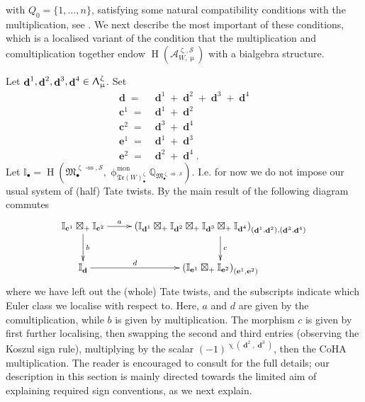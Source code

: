 \documentclass[a4paper,10pt]{amsart}
\renewcommand{\zeta}{\upzeta}
\renewcommand{\chi}{\upchi}
\renewcommand{\Lambda}{\Uplambda}
\renewcommand{\phi}{\upphi}
\renewcommand{\mu}{\upmu}
\newcommand{\SP}{\mathcal{S}}
\newcommand{\WWW}{\mathfrak{Tr}(W)}
\newcommand{\Mst}{\mathfrak{M}}
\newcommand{\phim}[1]{\phi^{\mon}_{#1}}
\DeclareMathOperator{\sst}{-ss}
\DeclareMathOperator{\mon}{mon}
\DeclareMathOperator{\cc}{\mathbf{c}}
\DeclareMathOperator{\dd}{\mathbf{d}}
\DeclareMathOperator{\ee}{\mathbf{e}}
\DeclareMathOperator{\HO}{H}
\begin{document}
with $Q_0=\{1,\ldots,n\}$, satisfying some natural compatibility conditions with the multiplication, see \cite[Def.5.3]{Da13}.  We next describe the most important of these conditions, which is a localised variant of the condition that the multiplication and comultiplication together endow $\HO\left(\mathcal{A}_{W,\mu}^{\zeta,\SP}\right)$ with a bialgebra structure.

Let $\dd^1,\dd^2,\dd^3,\dd^4\in\Lambda_{\mu}^{\zeta}$.  Set 
\begin{align*}
\dd=&\dd^1+\dd^2+\dd^3+\dd^4\\
\cc^1=&\dd^1+\dd^2\\
\cc^2=&\dd^3+\dd^4\\
\ee^1=&\dd^1+\dd^3\\
\ee^2=&\dd^2+\dd^4.
\end{align*}
Let $\mathbb{I}_{\bullet}=\HO\left(\Mst_{\bullet}^{\zeta\sst,\SP},\phim{\WWW^{\zeta}_{\bullet}}\mathbb{Q}_{\Mst_{\bullet}^{\zeta\sst,\SP}}\right)$.  I.e. for now we do not impose our usual system of (half) Tate twists.  By the main result of \cite{Da13} the following diagram commutes
\[
\xymatrix{
\mathbb{I}_{\cc^1}\boxtimes_+ \mathbb{I}_{\cc^2}\ar[d]^-{b}\ar[r]^-a&\left(\mathbb{I}_{\dd^1}\boxtimes_+  \mathbb{I}_{\dd^2}\boxtimes_+  \mathbb{I}_{\dd^3}\boxtimes_+  \mathbb{I}_{\dd^4}\right)_{(\dd^1,\dd^2),(\dd^3,\dd^4)}\ar[d]^-c\\
\mathbb{I}_{\dd}\ar[r]^-d& \left(\mathbb{I}_{\ee^1}\boxtimes_+ \mathbb{I}_{\ee^2}\right)_{(\ee^1,\ee^2)}
}
\]
where we have left out the (whole) Tate twists, and the subscripts indicate which Euler class we localise with respect to.  Here, $a$ and $d$ are given by the comultiplication, while $b$ is given by multiplication.  The morphism $c$ is given by first further localising, then swapping the second and third entries (observing the Koszul sign rule), multiplying by the scalar $(-1)^{\chi(\dd^2,\dd^3)}$, then the CoHA multiplication.  The reader is encouraged to consult \cite{Da13} for the full details; our description in this section is mainly directed towards the limited aim of explaining required sign conventions, as we next explain.
\end{document}
